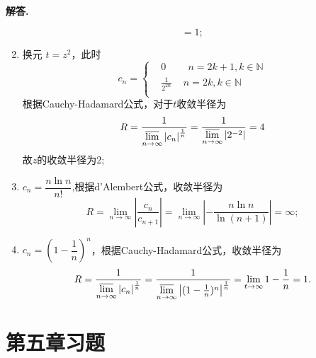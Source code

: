 \documentclass[11pt]{ctexart}
\newenvironment{solution}{\par\noindent\textbf{解答. }}{\par}
\begin{document}
\begin{solution}
\begin{enumerate}[(1)]
\begin{equation*}
              = 1;
            \end{equation*}
        \item 换元 $t = z^2$，此时
            \begin{equation*}
            c_n = \left\{
            \begin{aligned}
                &0 \ \qquad n=2k+1,k\in\mathbb{N}\\
                &\frac{1}{2^{2n}} \,\quad n=2k,k\in\mathbb{N}\\
            \end{aligned}
            \right
            .
            \end{equation*}
              根据Cauchy-Hadamard公式，对于$t$收敛半径为
              \begin{equation*}
                R = \frac{1}{\varlimsup\limits_{n\to\infty}\left|c_n\right|^{\frac{1}{n}}}
                  = \frac{1}{\varlimsup\limits_{n\to\infty}\left|2^{-2}\right|}
                  = 4
              \end{equation*}
               故$z$的收敛半径为2; 
        \item $c_n = \dfrac{n\ln{n}}{n!}$,根据d'Alembert公式，收敛半径为
            \begin{equation*}
            R = \lim_{n\to\infty}\left|\frac{c_n}{c_{n+1}}\right|
              = \lim_{n\to\infty}\left|-\frac{n\ln{n}}{\ln{(n+1)}}\right|
              = \infty;
            \end{equation*}
        \item $c_n = (1-\dfrac{1}{n})^n$，根据Cauchy-Hadamard公式，收敛半径为
        \begin{equation*}
        R = \frac{1}{\varlimsup\limits_{n\to\infty}\left|c_n\right|^{\frac{1}{n}}}
          = \frac{1}{\varlimsup\limits_{n\to\infty}\left|(1-\frac{1}{n})^n\right|^{\frac{1}{n}}}
          = \lim_{t\to\infty}1-\frac{1}{n}
          = 1.
        \end{equation*}
    \end{enumerate}
\end{solution}

\newpage
\section{第五章习题}
\end{document}
